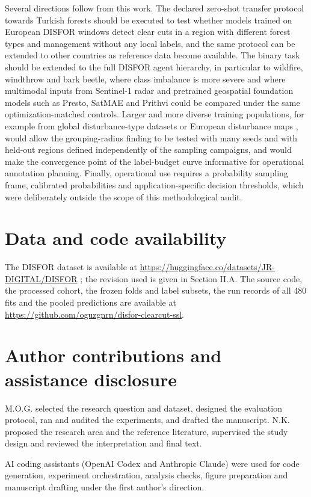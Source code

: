 \documentclass[11pt,a4paper]{article}
\begin{document}
Several directions follow from this work. The declared zero-shot transfer protocol towards Turkish forests should be executed to test whether models trained on European DISFOR windows detect clear cuts in a region with different forest types and management without any local labels, and the same protocol can be extended to other countries as reference data become available. The binary task should be extended to the full DISFOR agent hierarchy, in particular to wildfire, windthrow and bark beetle, where class imbalance is more severe and where multimodal inputs from Sentinel-1 radar \cite{ref2,ref29} and pretrained geospatial foundation models such as Presto, SatMAE and Prithvi \cite{ref7,ref15,ref16} could be compared under the same optimization-matched controls. Larger and more diverse training populations, for example from global disturbance-type datasets \cite{ref24} or European disturbance maps \cite{ref28,ref18}, would allow the grouping-radius finding to be tested with many seeds and with held-out regions defined independently of the sampling campaigns, and would make the convergence point of the label-budget curve informative for operational annotation planning. Finally, operational use requires a probability sampling frame, calibrated probabilities and application-specific decision thresholds, which were deliberately outside the scope of this methodological audit.

\section*{Data and code availability}
The DISFOR dataset is available at \url{https://huggingface.co/datasets/JR-DIGITAL/DISFOR} \cite{ref1}; the revision used is given in Section II.A. The source code, the processed cohort, the frozen folds and label subsets, the run records of all 480 fits and the pooled predictions are available at \url{https://github.com/oguzgnrn/disfor-clearcut-ssl}.

\section*{Author contributions and assistance disclosure}
M.O.G. selected the research question and dataset, designed the evaluation protocol, ran and audited the experiments, and drafted the manuscript. N.K. proposed the research area and the reference literature, supervised the study design and reviewed the interpretation and final text.

AI coding assistants (OpenAI Codex and Anthropic Claude) were used for code generation, experiment orchestration, analysis checks, figure preparation and manuscript drafting under the first author's direction.
\end{document}
